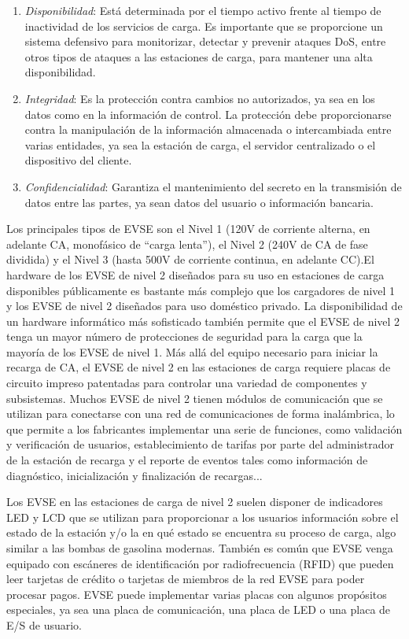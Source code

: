 \documentclass[12pt,a4paper,onecolumn,oneside]{report}
\begin{document}
\begin{enumerate}

\item \textit{Disponibilidad}: Está determinada por el tiempo activo frente al tiempo de inactividad de los servicios de carga. Es importante que se proporcione un sistema defensivo para monitorizar, detectar y prevenir ataques DoS, entre otros tipos de ataques a las estaciones de carga, para mantener una alta disponibilidad.
\item \textit{Integridad}: Es la protección contra cambios no autorizados, ya sea en los datos como en la información de control. La protección debe proporcionarse contra la manipulación de la información almacenada o intercambiada entre varias entidades, ya sea la estación de carga, el servidor centralizado o el dispositivo del cliente. 
\item \textit{Confidencialidad}: Garantiza el mantenimiento del secreto en la transmisión de datos entre las partes, ya sean datos del usuario o información bancaria.

\end{enumerate}

Los principales tipos de EVSE son el Nivel 1 (120V de corriente alterna, en adelante CA,  monofásico de ``carga lenta”), el Nivel 2 (240V de CA de fase dividida) y el Nivel 3 (hasta 500V de corriente continua, en adelante CC).El hardware de los EVSE de nivel 2 diseñados para su uso en estaciones de carga disponibles públicamente es bastante más complejo que los cargadores de nivel 1 y los EVSE de nivel 2 diseñados para uso doméstico privado. La disponibilidad de un hardware informático más sofisticado también permite que el EVSE de nivel 2 tenga un mayor número de protecciones de seguridad para la carga que la mayoría de los EVSE de nivel 1. Más allá del equipo necesario para iniciar la recarga de CA, el EVSE de nivel 2 en las estaciones de carga requiere placas de circuito impreso patentadas para controlar una variedad de componentes y subsistemas. Muchos EVSE de nivel 2 tienen módulos de comunicación que se utilizan para conectarse con una red de comunicaciones de forma inalámbrica, lo que permite a los fabricantes implementar una serie de funciones, como validación y verificación de usuarios, establecimiento de tarifas por parte del administrador de la estación de recarga y el reporte de eventos tales como información de diagnóstico, inicialización y finalización de recargas...

Los EVSE en las estaciones de carga de nivel 2 suelen disponer de indicadores LED y LCD que se utilizan para proporcionar a los usuarios información sobre el estado de la estación y/o la en qué estado se encuentra su proceso de carga, algo similar a las bombas de gasolina modernas. También es común que EVSE venga equipado con escáneres de identificación por radiofrecuencia (RFID) que pueden leer tarjetas de crédito o tarjetas de miembros de la red EVSE para poder procesar pagos. EVSE puede implementar varias placas con algunos propósitos especiales, ya sea una placa de comunicación, una placa de LED o una placa de E/S de usuario. 
\end{document}
